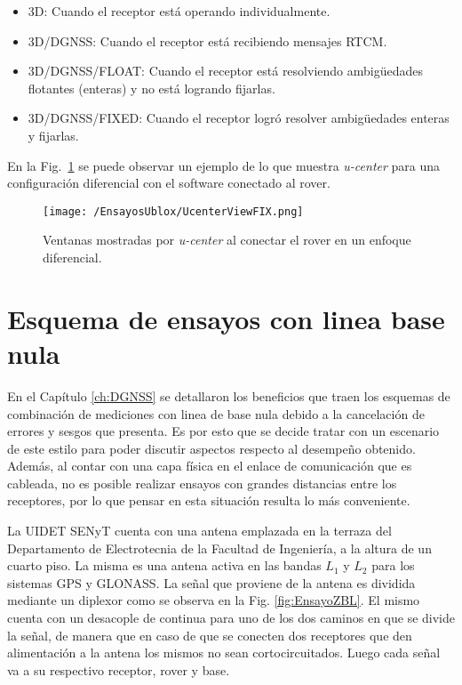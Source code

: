 \documentclass[a4paper,12pt,oneside,onecolumn,final,openright]{book}%
\begin{document}
\begin{itemize}
	\item 3D: Cuando el receptor está operando individualmente.
	\item 3D/DGNSS: Cuando el receptor está recibiendo mensajes RTCM.
	\item 3D/DGNSS/FLOAT: Cuando el receptor está resolviendo ambigüedades flotantes (enteras) y no está logrando fijarlas.
	\item 3D/DGNSS/FIXED: Cuando el receptor logró resolver ambigüedades enteras y fijarlas.
\end{itemize}
	En la Fig.~\ref{fig:ucenter} se puede observar un ejemplo de lo que muestra \textit{u-center} para una configuración diferencial con el software conectado al rover.
\begin{figure}
    \centering
    \texttt{[image: /EnsayosUblox/UcenterViewFIX.png]}
    \caption{Ventanas mostradas por \textit{u-center} al conectar el rover en un enfoque diferencial.}
    \label{fig:ucenter}
\end{figure}

\section{Esquema de ensayos con linea base nula}\label{sec:esquema_ZBL}
	En el Capítulo \ref{ch:DGNSS} se detallaron los beneficios que traen los esquemas de combinación de mediciones con linea de base nula debido a la cancelación de errores y sesgos que presenta. Es por esto que se decide tratar con un escenario de este estilo para poder discutir aspectos respecto al desempeño obtenido. Además, al contar con una capa física en el enlace de comunicación que es cableada, no es posible realizar ensayos con grandes distancias entre los receptores, por lo que pensar en esta situación resulta lo más conveniente.
	
	La UIDET SENyT cuenta con una antena emplazada en la terraza del Departamento de Electrotecnia de la Facultad de Ingeniería, a la altura de un cuarto piso. La misma es una antena activa en las bandas $L_1$ y $L_2$ para los sistemas GPS y GLONASS. La señal que proviene de la antena es dividida mediante un diplexor como se observa en la Fig. \ref{fig:EnsayoZBL}. El mismo cuenta con un desacople de continua para uno de los dos caminos en que se divide la señal, de manera que en caso de que se conecten dos receptores que den alimentación a la antena los mismos no sean cortocircuitados. Luego cada señal va a su respectivo receptor, rover y base. 
\end{document}
